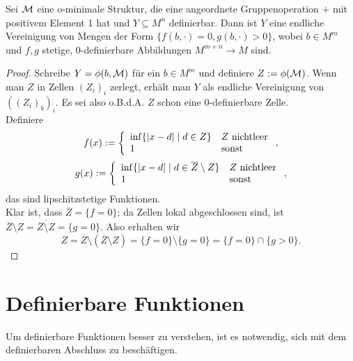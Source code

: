 \begin{lemma}
	Sei $\mathcal{M}$ eine o-minimale Struktur, die eine angeordnete Gruppenoperation $+$ mit positivem Element 1 hat und $Y\subseteq M^n$ definierbar. Dann ist $Y$ eine endliche Vereinigung von Mengen der Form $\{f(b,\cdot)=0,g(b,\cdot)>0\}$, wobei $b\in M^m$ und $f,g$ stetige, 0-definierbare Abbildungen $M^{m+n}\rightarrow M$ sind.
\end{lemma}
\begin{proof}
	Schreibe $Y=\phi(b,\mathcal{M})$ für ein $b\in M^m$ und definiere $Z:=\phi(\mathcal{M})$. Wenn man $Z$ in Zellen $(Z_i)_i$ zerlegt, erhält man $Y$ als endliche Vereinigung von $((Z_i)_b)_i$.  Es sei also o.B.d.A. $Z$ schon eine 0-definierbare Zelle.\\
	Definiere $$f(x):=\left\{\begin{array}{ll}
	\inf\{{\left| x-d \right|}\mid d\in Z\}&Z\text{ nichtleer}\\
	1&\text{sonst}
	\end{array}\right.,$$
	$$g(x):=\left\{\begin{array}{ll}
	\inf\{{\left| x-d \right|}\mid d\in \overline{Z}\setminus Z\}&Z\text{ nichtleer}\\
	1&\text{sonst}
	\end{array}\right.,$$ das sind lipschitzstetige Funktionen.\\
	Klar ist, dass $\overline{Z}=\{f=0\}$; da Zellen lokal abgeschlossen sind, ist $\overline{Z}\setminus Z=\overline{\overline{Z}\setminus Z}=\{g=0\}$. Also erhalten wir $$Z=\overline{Z}\setminus(\overline{Z}\setminus Z)=\{f=0\}\setminus\{g=0\}=\{f=0\}\cap\{g>0\}.$$
\end{proof}

\section{Definierbare Funktionen}
Um definierbare Funktionen besser zu verstehen, ist es notwendig, sich mit dem definierbaren Abschluss zu beschäftigen.